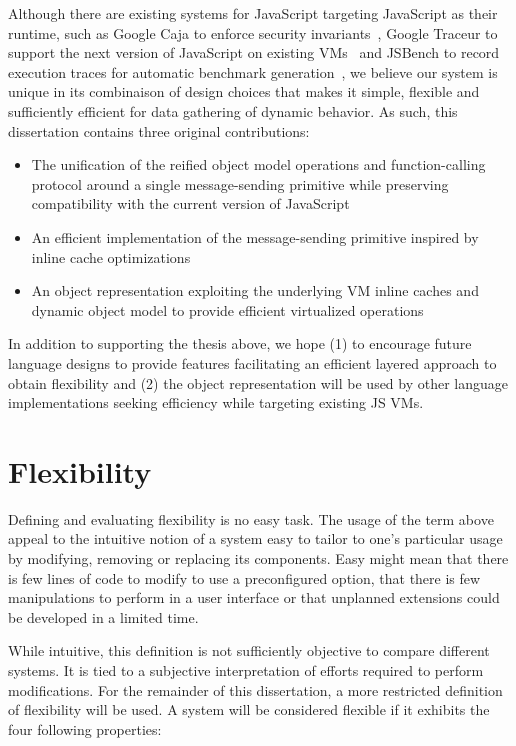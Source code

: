 Although there are existing systems for JavaScript targeting JavaScript as
their runtime, such as Google Caja to enforce security
invariants~\cite{Caja:2012}, Google Traceur to support the next version of
JavaScript on existing VMs~\cite{Traceur:2012} and JSBench to record execution
traces for automatic benchmark generation~\cite{Richards:2011}, we believe our
system is unique in its combinaison of design choices that makes it simple,
flexible and sufficiently efficient for data gathering of dynamic behavior. As
such, this dissertation contains three original contributions: 
\begin{itemize}
    \item The unification of the reified object model operations and
        function-calling protocol around a single message-sending primitive
        while preserving compatibility with the current version of JavaScript
    \item An efficient implementation of the message-sending primitive inspired
          by inline cache optimizations
    \item An object representation exploiting the underlying VM inline caches
          and dynamic object model to provide efficient virtualized operations
\end{itemize}

In addition to supporting the thesis above, we hope (1) to encourage future
language designs to provide features facilitating an efficient layered approach
to obtain flexibility and (2) the object representation will be used by other
language implementations seeking efficiency while targeting existing JS VMs.

\section{Flexibility}

Defining and evaluating flexibility is no easy task. The usage of the term
above appeal to the intuitive notion of a system easy to tailor to one's
particular usage by modifying, removing or replacing its components. Easy might
mean that there is few lines of code to modify to use a preconfigured option,
that there is few manipulations to perform in a user interface or that unplanned
extensions could be developed in a limited time.

While intuitive, this definition is not sufficiently objective to compare
different systems. It is tied to a subjective interpretation of efforts
required to perform modifications. For the remainder of this dissertation, a
more restricted definition of flexibility will be used. A system will be
considered flexible if it exhibits the four following properties:

